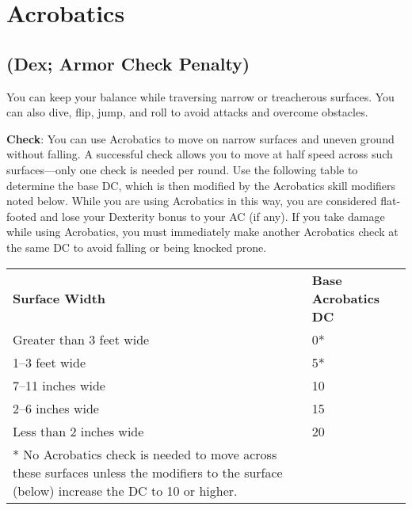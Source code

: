 \section{Acrobatics}

\label{f0}				
\subsection{(Dex; Armor Check Penalty)}

				
You can keep your balance while traversing narrow or treacherous surfaces. You can also dive, flip, jump, and roll to avoid attacks and overcome obstacles.
				
\textbf{Check}: You can use Acrobatics to move on narrow surfaces and uneven ground without falling. A successful check allows you to move at half speed across such surfaces---only one check is needed per round. Use the following table to determine the base DC, which is then modified by the Acrobatics skill modifiers noted below. While you are using Acrobatics in this way, you are considered flat-footed and lose your Dexterity bonus to your AC (if any). If you take damage while using Acrobatics, you must immediately make another Acrobatics check at the same DC to avoid falling or being knocked prone.
\begin{table}
 \sffamily
 \begin{tabular}{ll}
  \textbf{Surface Width} & \textbf{Base Acrobatics DC} \\
Greater than 3 feet wide & 0* \\
1--3 feet wide & 5* \\
7--11 inches wide & 10\\
2--6 inches wide & 15 \\
Less than 2 inches wide & 20\\
 * No Acrobatics check is needed to move across these surfaces unless the modifiers to the surface (below) increase the DC to 10 or higher.
 \end{tabular}
\end{table}
				
